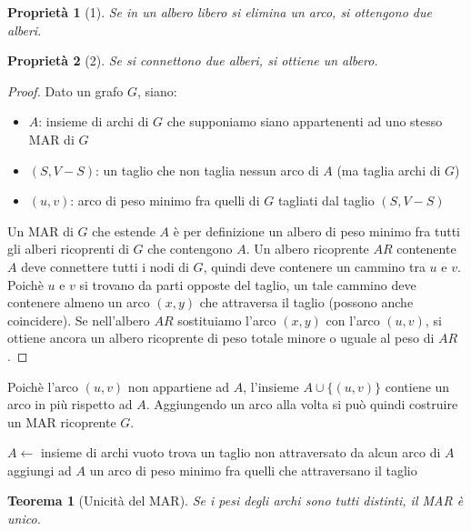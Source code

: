 \documentclass[11pt]{article}
\newtheorem*{theorem}{Teorema}
\newtheorem*{proprietà}{Proprietà}
\begin{document}
\begin{proprietà}[1]
    Se in un albero libero si elimina un arco, si ottengono due alberi.
\end{proprietà}
\begin{proprietà}[2]
    Se si connettono due alberi, si ottiene un albero.
\end{proprietà}
\begin{proof}
    Dato un grafo $G$, siano:
    \begin{itemize}
        \item $A$: insieme di archi di $G$ che supponiamo siano appartenenti ad uno stesso MAR di $G$
        \item $(S,V-S)$: un taglio che non taglia nessun arco di $A$ (ma taglia archi di $G$)
        \item $(u,v)$: arco di peso minimo fra quelli di $G$ tagliati dal taglio $(S,V-S)$
    \end{itemize}
    Un MAR di $G$ che estende $A$ è per definizione un albero di peso minimo fra tutti gli alberi ricoprenti  di $G$ che 
    contengono $A$. Un albero ricoprente $AR$ contenente $A$ deve connettere tutti i nodi di $G$, quindi deve contenere 
    un cammino tra $u$ e $v$. Poichè $u$ e $v$ si trovano da parti opposte del taglio, un tale cammino deve contenere almeno 
    un arco $(x,y)$ che attraversa il taglio (possono anche coincidere). Se nell'albero $AR$ sostituiamo l'arco $(x,y)$
    con l'arco $(u,v)$, si ottiene ancora un albero ricoprente di peso totale minore o uguale al peso di $AR$. 
\end{proof}
Poichè l'arco $(u,v)$ non appartiene ad $A$, l'insieme $A\cup \{(u,v)\}$ contiene un arco in più rispetto ad $A$. Aggiungendo 
un arco alla volta si può quindi costruire un MAR ricoprente $G$.
\begin{algorithm}
    \caption{TROVA MAR(G)}
    \begin{algorithmic}
        \State $A\gets$ insieme di archi vuoto
            \State trova un taglio non attraversato da alcun arco di $A$
            \State aggiungi ad $A$ un arco di peso minimo fra quelli che attraversano il taglio 
        \EndWhile
    \end{algorithmic}
\end{algorithm}
\begin{theorem}[Unicità del MAR]
    Se i pesi degli archi sono tutti distinti, il MAR è unico.
\end{theorem}
\end{document}
